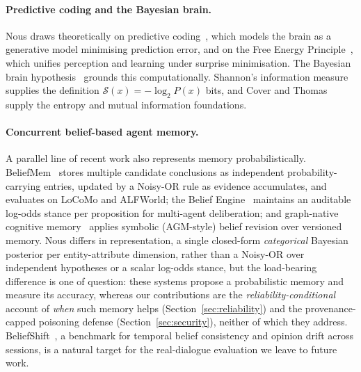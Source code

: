\documentclass[11pt,a4paper,twocolumn]{article}
\begin{document}
\paragraph{Predictive coding and the Bayesian brain.}
Nous draws theoretically on predictive coding~\citep{rao1999predictive}, which
models the brain as a generative model minimising prediction error, and on
the Free Energy Principle~\citep{friston2010fep}, which unifies perception and
learning under surprise minimisation. The Bayesian brain
hypothesis~\citep{knill2004bayesian} grounds this computationally. Shannon's
information measure~\citep{shannon1948} supplies the definition
$\mathcal{S}(x) = -\log_2 P(x)$ bits, and Cover and Thomas~\citep{cover2006}
supply the entropy and mutual information foundations.

\paragraph{Concurrent belief-based agent memory.}
A parallel line of recent work also represents memory probabilistically.
BeliefMem~\citep{liao2026beliefmem} stores multiple candidate conclusions as
independent probability-carrying entries, updated by a Noisy-OR rule as evidence
accumulates, and evaluates on LoCoMo and ALFWorld; the Belief
Engine~\citep{yang2026beliefengine} maintains an auditable log-odds stance per
proposition for multi-agent deliberation; and graph-native cognitive
memory~\citep{park2026graphnative} applies symbolic (AGM-style) belief revision
over versioned memory. Nous differs in representation, a single closed-form
\emph{categorical} Bayesian posterior per entity-attribute dimension, rather than
a Noisy-OR over independent hypotheses or a scalar log-odds stance, but the
load-bearing difference is one of question: these systems propose a probabilistic
memory and measure its accuracy, whereas our contributions are the
\emph{reliability-conditional} account of \emph{when} such memory helps
(Section~\ref{sec:reliability}) and the provenance-capped poisoning defense
(Section~\ref{sec:security}), neither of which they address.
BeliefShift~\citep{myakala2026beliefshift}, a benchmark for temporal belief
consistency and opinion drift across sessions, is a natural target for the
real-dialogue evaluation we leave to future work.
\end{document}
